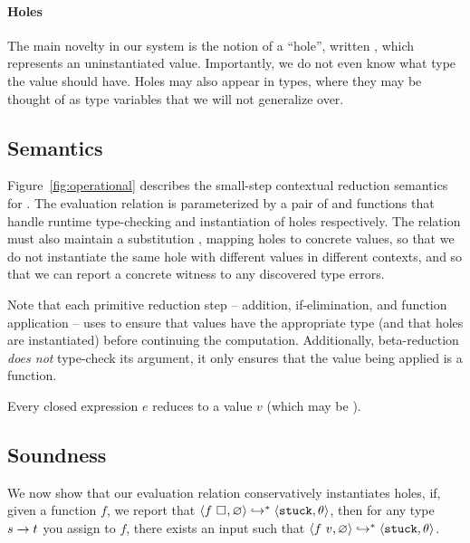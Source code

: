 \paragraph{Holes}
\label{sec:holes}
The main novelty in our system is the notion of a ``hole'', written
\ehole{}, which represents an uninstantiated value. Importantly, we do
not even know what type the value should have. Holes may also appear in
types, where they may be thought of as type variables that we will not
generalize over.

\subsection{Semantics}
\label{sec:semantics}


Figure~\ref{fig:operational} describes the small-step contextual
reduction semantics for \lang. The evaluation relation is parameterized
by a pair of \forcesym and \gensym functions that handle runtime
type-checking and instantiation of holes respectively. The relation must
also maintain a substitution \su, mapping holes to concrete values, so
that we do not instantiate the same hole with different values in
different contexts, and so that we can report a concrete witness to any
discovered type errors.

Note that each primitive reduction step -- addition, if-elimination, and
function application -- uses \forcesym to ensure that values have the
appropriate type (and that holes are instantiated) before continuing the
computation. Additionally, beta-reduction \emph{does not} type-check its
argument, it only ensures that the value being applied is a function.

\begin{thm}
\label{thm:all-reduce}
  Every closed expression $e$ reduces to a value $v$ (which may be \stuck).
\end{thm}

\subsection{Soundness}
\label{sec:soundness}
We now show that our evaluation relation conservatively instantiates
holes, \ie if, given a function $f$, we report that 
$\langle f \ \square_{}, \varnothing \rangle \hookrightarrow^{*} \langle \mathtt{stuck}, \theta \rangle$,
then for any type ${s} \rightarrow t$ you assign to $f$, there exists an input  such that
$\langle f \ v, \varnothing \rangle \hookrightarrow^{*} \langle \mathtt{stuck}, \theta \rangle$.

